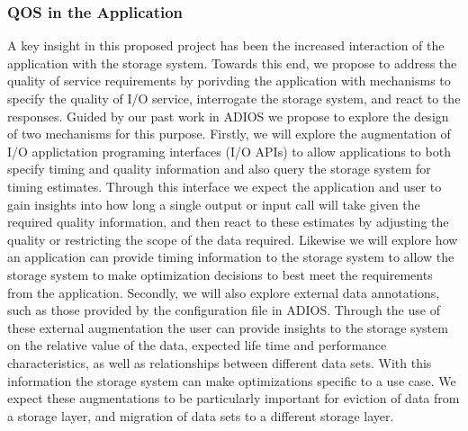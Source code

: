 \subsubsection{QOS in the Application}
A key insight in this proposed project has been the increased interaction of
the application with the storage system. Towards this end, we propose to
address the quality of service requirements by porivding the application
with mechanisms to specify the quality of I/O service, interrogate the
storage system, and react to the responses. Guided by our past work in
ADIOS\cite{lofstead2008flexible} we propose to explore the design of two
mechanisms for this purpose. Firstly, we will explore the augmentation of
I/O applictation programing interfaces (I/O APIs) to allow applications to
both specify timing and quality information and also query the storage
system for timing estimates. Through this interface we expect the
application and user to gain insights into how long a single output or input
call will take given the required quality information, and then react to
these estimates by adjusting the quality or restricting the scope of the
data required. Likewise we will explore how an application can provide
timing information to the storage system to allow the storage system to make
optimization decisions to best meet the requirements from the application. 
%
Secondly, we will also explore external data annotations, such as those
provided by the configuration file in ADIOS. Through the use of these
external augmentation the user can provide insights to the storage system on
the relative value of the data, expected life time and performance
characteristics, as well as relationships between different data sets. With
this information the storage system can make optimizations specific to a use
case. We expect these augmentations to be particularly important for
eviction of data from a storage layer, and migration of data sets to a
different storage layer. 





